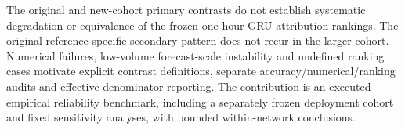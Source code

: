 \documentclass[conference]{IEEEtran}
\begin{document}
The original and new-cohort primary contrasts do not establish systematic degradation or equivalence of the frozen one-hour GRU attribution rankings. The original reference-specific secondary pattern does not recur in the larger cohort. Numerical failures, low-volume forecast-scale instability and undefined ranking cases motivate explicit contrast definitions, separate accuracy/numerical/ranking audits and effective-denominator reporting. The contribution is an executed empirical reliability benchmark, including a separately frozen deployment cohort and fixed sensitivity analyses, with bounded within-network conclusions.



\end{document}
